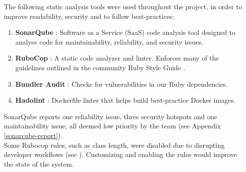 The following static analysis tools were used throughout the project, in order to improve readability, security and to follow best-practices:
\\
\begin{enumerate}
    \item\textbf{SonarQube} \cite{sonarqube_cloud}: Software as a Service (SaaS) code analysis tool designed to analyse code for maintainability, reliability, and security issues.
    \item\textbf{RuboCop} \cite{rubocop}: A static code analyzer and linter. Enforces many of the guidelines outlined in the community Ruby Style Guide \cite{rubystyleguide}.
    \item \textbf{Bundler Audit} \cite{bundler_audit}: Checks for vulnerabilities in our Ruby dependencies.
    \item\textbf{Hadolint} \cite{hadolint}: Dockerfile linter that helps build best-practice Docker images.
\end{enumerate}
%
SonarQube reports one reliability issue, three security hotspots and one maintainability issue, all deemed low priority by the team (see Appendix \ref{sonarcube-report}).
\\
Some Rubocop rules, such as class length, were disabled due to disrupting developer workflows (see \cite{rubocop_config}). Customizing and enabling the rules would improve the state of the system.
